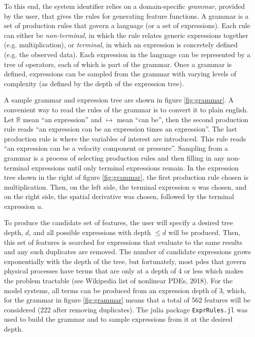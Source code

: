 \documentclass{article}
\begin{document}
To this end, the system identifier relies on a domain-specific \textit{grammar}, provided by the user, that gives the rules for generating feature functions. A grammar is a set of production rules that govern a language (or a set of expressions). Each rule can either be \textit{non-terminal}, in which the rule relates generic expressions together (e.g. multiplication), or \textit{terminal}, in which an expression is concretely defined (e.g. the observed data). Each expression in the language can be represented by a tree of operators, each of which is part of the grammar. Once a grammar is defined, expressions can be sampled from the grammar with varying levels of complexity (as defined by the depth of the expression tree).

A sample grammar and expression tree are shown in figure \ref{fig:grammar}. A convenient way to read the rules of the grammar is to convert it to plain english. Let $\mathbb{R}$ mean ``an expression'' and $\mapsto$ mean ``can be'', then the second production rule reads ``an expression can be an expression times an expression''. The last production rule is where the variables of interest are introduced. This rule reads ``an expression can be a velocity component or pressure''. Sampling from a grammar is a process of selecting production rules and then filling in any non-terminal expressions until only terminal expressions remain. In the expression tree shown in the right of figure \ref{fig:grammar}, the first production rule chosen is multiplication. Then, on the left side, the terminal expression $u$ was chosen, and on the right side, the spatial derivative was chosen, followed by the terminal expression $u$.

To produce the candidate set of features, the user will specify a desired tree depth, $d$, and all possible expressions with depth $\leq d$ will be produced. Then, this set of features is searched for expressions that evaluate to the same results and any such duplicates are removed. The number of candidate expressions grows exponentially with the depth of the tree, but fortunately, most pdes that govern physical processes have terms that are only at a depth of 4 or less which makes the problem tractable (see Wikipedia list of nonlinear PDEs, 2018). For the model systems, all terms can be produced from an expression depth of 3, which, for the grammar in figure \ref{fig:grammar} means that a total of 562 features will be considered (222 after removing duplicates). The julia package \verb|ExprRules.jl| was used to build the grammar and to sample expressions from it at the desired depth.
\end{document}
